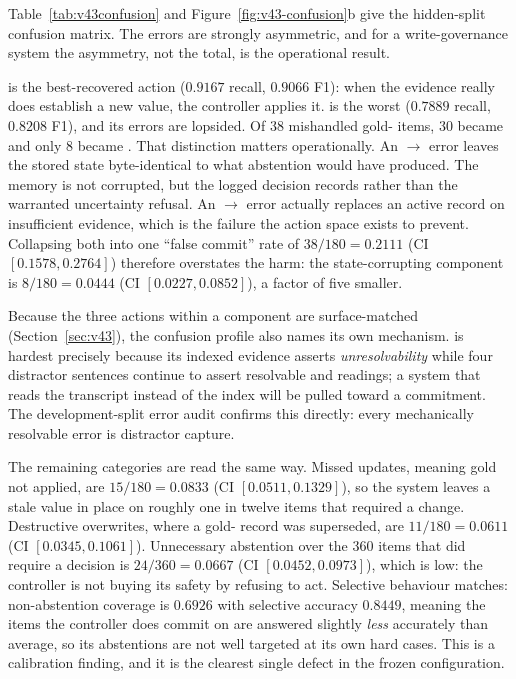 Table~\ref{tab:v43confusion} and Figure~\ref{fig:v43-confusion}b give the
hidden-split confusion matrix. The errors are strongly asymmetric, and for a
write-governance system the asymmetry, not the total, is the operational
result.

\supersede{} is the best-recovered action ($0.9167$ recall, $0.9066$ F1):
when the evidence really does establish a new value, the controller applies it.
\abstain{} is the worst ($0.7889$ recall, $0.8208$ F1), and its errors are
lopsided. Of $38$ mishandled gold-\abstain{} items, $30$ became \keep{} and
only $8$ became \supersede{}. That distinction matters operationally. An
\abstain$\to$\keep{} error leaves the stored state byte-identical to what
abstention would have produced. The memory is not corrupted, but the logged
decision records \keep{} rather than the warranted uncertainty refusal. An
\abstain$\to$\supersede{} error actually replaces an active record on
insufficient evidence, which is the failure the action space exists to prevent.
Collapsing both into one ``false commit'' rate of $38/180 = 0.2111$
(CI $[0.1578, 0.2764]$) therefore overstates the harm: the state-corrupting
component is $8/180 = 0.0444$ (CI $[0.0227, 0.0852]$), a factor of five
smaller.

Because the three actions within a component are surface-matched
(Section~\ref{sec:v43}), the confusion profile also names its own mechanism.
\abstain{} is hardest precisely because its indexed evidence asserts
\emph{unresolvability} while four distractor sentences continue to assert
resolvable \keep{} and \supersede{} readings; a system that reads the transcript
instead of the index will be pulled toward a commitment. The development-split
error audit confirms this directly: every mechanically resolvable error is
distractor capture.

The remaining categories are read the same way. Missed updates, meaning gold
\supersede{} not applied, are $15/180 = 0.0833$ (CI $[0.0511, 0.1329]$), so
the system leaves a stale value in place on roughly one in twelve items that
required a change. Destructive overwrites, where a gold-\keep{} record was
superseded, are $11/180 = 0.0611$ (CI $[0.0345, 0.1061]$). Unnecessary
abstention over the $360$ items that did require a decision is
$24/360 = 0.0667$ (CI $[0.0452, 0.0973]$), which is low: the controller is not
buying its safety by refusing to act. Selective behaviour matches: non-abstention
coverage is $0.6926$ with selective accuracy $0.8449$, meaning the items the
controller does commit on are answered slightly \emph{less} accurately than
average, so its abstentions are not well targeted at its own hard cases. This
is a calibration finding, and it is the clearest single defect in the frozen
configuration.

